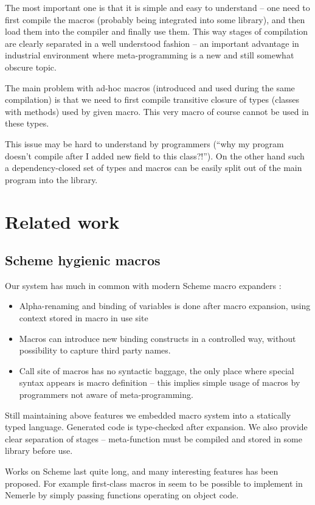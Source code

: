 \documentclass{llncs}
\begin{document}
The most important one is that it is simple and easy to understand --
one need to first compile the macros (probably being integrated into
some library), and then load them into the compiler and finally use
them. This way stages of compilation are clearly separated in a well
understood fashion -- an important advantage in industrial environment
where meta-programming is a new and still somewhat obscure topic.

The main problem with ad-hoc macros (introduced and used during the
same compilation) is that we need to first compile transitive closure
of types (classes with methods) used by given macro. This very macro
of course cannot be used in these types.

This issue may be hard to understand by programmers (``why my program
doesn't compile after I added new field to this class?!''). On the
other hand such a dependency-closed set of types and macros can be
easily split out of the main program into the library.



\section{Related work}
\subsection{Scheme hygienic macros}
Our system has much in common with modern Scheme macro expanders \cite{Scheme:HygienicAlg}:
\begin{itemize}
\item Alpha-renaming and binding of variables is done after macro expansion, using
      context stored in macro in use site
\item Macros can introduce new binding constructs in a controlled way,
      without possibility to capture third party names.
\item Call site of macros has no syntactic baggage, the only place where
      special syntax appears is macro definition -- this implies simple
      usage of macros by programmers not aware of meta-programming.
\end{itemize}

Still maintaining above features we embedded macro system into a statically typed
language. Generated code is type-checked after expansion. We also provide clear
separation of stages -- meta-function must be compiled and stored in some library
before use.

Works on Scheme last quite long, and many interesting features has been proposed.
For example first-class macros in \cite{Macros:FirstClass} seem to be possible
to implement in Nemerle by simply passing functions operating on object code.
\end{document}
